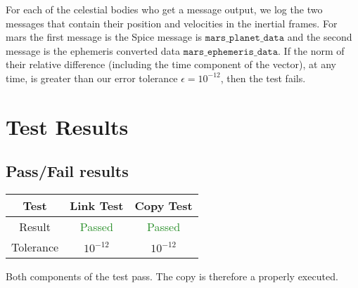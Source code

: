 \documentclass[]{BasiliskReportMemo}
\begin{document}
For each of the celestial bodies who get a message output, we log the two messages that contain their position and velocities in the inertial frames. For mars the first message is the Spice message is $\texttt{mars$\_$planet$\_$data}$
and the second message is the ephemeris converted data $\texttt{mars$\_$ephemeris$\_$data}$. If the norm of their relative difference (including the time component of the vector), at any time, is greater than our error tolerance $\epsilon =10^{-12}$, then the test fails.


\section{Test Results}

\subsection{Pass/Fail results}

\begin{center}
\begin{tabular}{c|c|c}
Test & Link Test & Copy Test \\ \hline
Result &  \textcolor{ForestGreen}{Passed} &  \textcolor{ForestGreen}{Passed} \\ \hline
Tolerance & $10^{-12}$ & $10^{-12}$
\end{tabular}
\end{center}

Both components of the test pass. The copy is therefore a properly executed.
\end{document}
